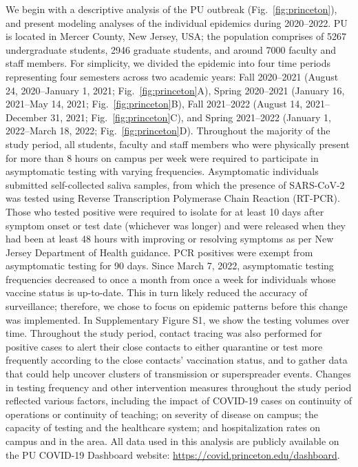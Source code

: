 \documentclass[12pt]{article}
\newcommand{\fref}[1]{Fig.~\ref{fig:#1}}
\begin{document}
We begin with a descriptive analysis of the PU outbreak (\fref{princeton}), and present modeling analyses of the individual epidemics during 2020--2022.
PU is located in Mercer County, New Jersey, USA;
the population comprises of 5267 undergraduate students, 2946 graduate students, and around 7000 faculty and staff members.
For simplicity, we divided the epidemic into four time periods representing four semesters across two academic years: Fall 2020--2021 (August 24, 2020--January 1, 2021; \fref{princeton}A), Spring 2020--2021 (January 16, 2021--May 14, 2021; \fref{princeton}B), Fall 2021--2022 (August 14, 2021--December 31, 2021; \fref{princeton}C), and Spring 2021--2022 (January 1, 2022--March 18, 2022; \fref{princeton}D).
Throughout the majority of the study period, all students, faculty and staff members who were physically present for more than 8 hours on campus per week were required to participate in asymptomatic testing with varying frequencies.
Asymptomatic individuals submitted self-collected saliva samples, from which the presence of SARS-CoV-2 was tested using Reverse Transcription Polymerase Chain Reaction (RT-PCR).  
Those who tested positive were required to isolate for at least 10 days after symptom onset or test date (whichever was longer) and were released when they had been at least 48 hours with improving or resolving symptoms as per New Jersey Department of Health guidance.
PCR positives were exempt from asymptomatic testing for 90 days.
Since March 7, 2022, asymptomatic testing frequencies decreased to once a month from once a week for individuals whose vaccine status is up-to-date. This in turn likely reduced the accuracy of surveillance; therefore, we chose to focus on epidemic patterns before this change was implemented.
In Supplementary Figure S1, we show the testing volumes over time.
Throughout the study period, contact tracing was also performed for positive cases to alert their close contacts to either quarantine or test more frequently according to the close contacts' vaccination status, and to gather data that could help uncover clusters of transmission or superspreader events.
Changes in testing frequency and other intervention measures throughout the study period reflected various factors, including the impact of COVID-19 cases on continuity of operations or continuity of teaching; on severity of disease on campus; the capacity of testing and the healthcare system; and hospitalization rates on campus and in the area.
All data used in this analysis are publicly available on the PU COVID-19 Dashboard website: \url{https://covid.princeton.edu/dashboard}.
\end{document}
